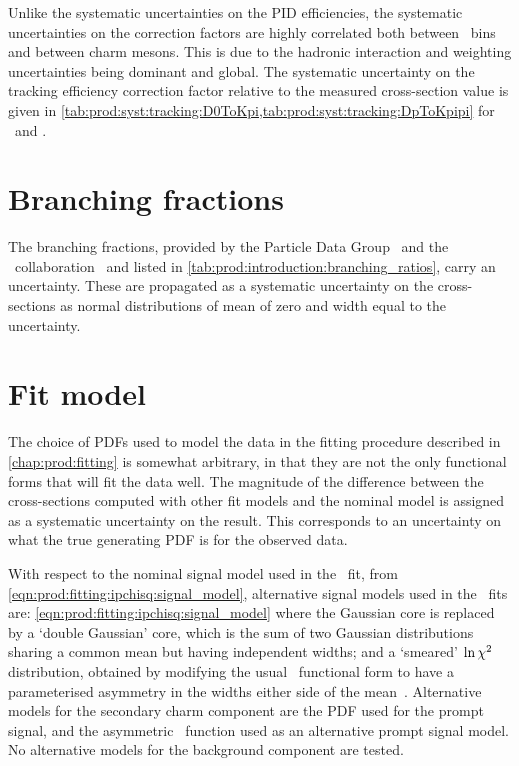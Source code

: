 Unlike the systematic uncertainties on the \ac{PID} efficiencies, the 
systematic uncertainties on the correction factors are highly correlated both 
between \pTy\ bins and between charm mesons.
This is due to the hadronic interaction and weighting uncertainties being 
dominant and global.
The systematic uncertainty on the tracking efficiency correction factor 
relative to the measured cross-section value is given in 
\cref{tab:prod:syst:tracking:D0ToKpi,tab:prod:syst:tracking:DpToKpipi} for 
\DzToKpi\ and \DpToKpipi.

\section{Branching fractions}
\label{chap:prod:syst:bf}

The branching fractions, provided by the Particle Data Group~\cite{PDG2014} and 
the \cleo\ collaboration~\cite{Alexander:2008aa} and listed in 
\cref{tab:prod:introduction:branching_ratios}, carry an uncertainty.
These are propagated as a systematic uncertainty on the cross-sections as 
normal distributions of mean of zero and width equal to the uncertainty.

\section{Fit model}
\label{chap:prod:syst:fitting}

The choice of \acp{PDF} used to model the data in the fitting procedure 
described in \cref{chap:prod:fitting} is somewhat arbitrary, in that they are 
not the only functional forms that will fit the data well.
The magnitude of the difference between the cross-sections computed with other 
fit models and the nominal model is assigned as a systematic uncertainty on the 
result.
This corresponds to an uncertainty on what the true generating \ac{PDF} is for 
the observed data.

With respect to the nominal signal model used in the \lnipchisq\ fit, from 
\cref{eqn:prod:fitting:ipchisq:signal_model}, alternative signal models used in 
the \lnipchisq\ fits are: \cref{eqn:prod:fitting:ipchisq:signal_model} where 
the Gaussian core is replaced by a `double Gaussian' core, which is the sum of 
two Gaussian distributions sharing a common mean but having independent widths; 
and a `smeared' $\ln{\ensuremath{\chi^2}}$ distribution, obtained by modifying the usual 
\chisq\ functional form to have a parameterised asymmetry in the widths either 
side of the mean~\cite{LHCb-CONF-2016-010}.
Alternative models for the secondary charm component are the \ac{PDF} used for 
the prompt signal, and the asymmetric \chisq\ function used as an alternative 
prompt signal model.
No alternative models for the background component are tested.

